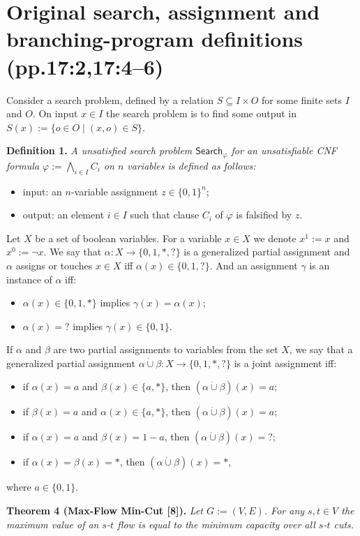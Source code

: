 \documentclass[10pt,a4paper]{article}
\newcommand{\Search}{\mathsf{Search}}
\newcommand{\joint}{\mathbin{\dot\cup}}
\newenvironment{result}[1]{\par\medskip\noindent\textbf{#1.}\itshape}{\par\medskip}
\begin{document}
\section*{Original search, assignment and branching-program definitions (pp.17:2,17:4--6)}
Consider a search problem, defined by a relation $S\subseteq I\times O$ for some finite sets $I$ and $O$. On input $x\in I$ the search problem is to find some output in $S(x):=\{o\in O\mid(x,o)\in S\}$.
\begin{result}{Definition 1}
A unsatisfied search problem $\Search_\varphi$ for an unsatisfiable CNF formula $\varphi:=\bigwedge_{i\in I}C_i$ on $n$ variables is defined as follows:
\begin{itemize}\item input: an $n$-variable assignment $z\in\{0,1\}^n$;
\item output: an element $i\in I$ such that clause $C_i$ of $\varphi$ is falsified by $z$.\end{itemize}
\end{result}
Let $X$ be a set of boolean variables. For a variable $x\in X$ we denote $x^1:=x$ and $x^0:=\neg x$.
We say that $\alpha:X\to\{0,1,*,?\}$ is a generalized partial assignment and $\alpha$ assigns or touches $x\in X$ iff $\alpha(x)\in\{0,1,?\}$. And an assignment $\gamma$ is an instance of $\alpha$ iff:
\begin{itemize}\item $\alpha(x)\in\{0,1,*\}$ implies $\gamma(x)=\alpha(x)$;
\item $\alpha(x)=?$ implies $\gamma(x)\in\{0,1\}$.\end{itemize}
If $\alpha$ and $\beta$ are two partial assignments to variables from the set $X$, we say that a generalized partial assignment $\alpha\joint\beta:X\to\{0,1,*,?\}$ is a joint assignment iff:
\begin{itemize}\item if $\alpha(x)=a$ and $\beta(x)\in\{a,*\}$, then $(\alpha\joint\beta)(x)=a$;
\item if $\beta(x)=a$ and $\alpha(x)\in\{a,*\}$, then $(\alpha\joint\beta)(x)=a$;
\item if $\alpha(x)=a$ and $\beta(x)=1-a$, then $(\alpha\joint\beta)(x)=?$;
\item if $\alpha(x)=\beta(x)=*$, then $(\alpha\joint\beta)(x)=*$,
\end{itemize}
where $a\in\{0,1\}$.
\begin{result}{Theorem 4 (Max-Flow Min-Cut [8])}
Let $G:=(V,E)$. For any $s,t\in V$ the maximum value of an $s$-$t$ flow is equal to the minimum capacity over all $s$-$t$ cuts.
\end{result}
\end{document}
